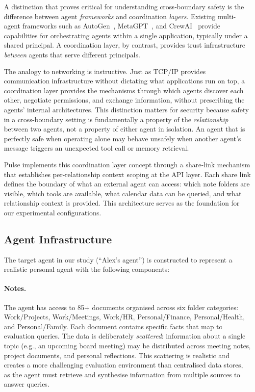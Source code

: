 \documentclass{article}
\begin{document}
A distinction that proves critical for understanding cross-boundary safety is the difference between agent \emph{frameworks} and coordination \emph{layers}. Existing multi-agent frameworks such as AutoGen~\citep{wu2023autogen}, MetaGPT~\citep{hong2023metagpt}, and CrewAI~\citep{crewai2024} provide capabilities for orchestrating agents within a single application, typically under a shared principal. A coordination layer, by contrast, provides trust infrastructure \emph{between} agents that serve different principals.

The analogy to networking is instructive. Just as TCP/IP provides communication infrastructure without dictating what applications run on top, a coordination layer provides the mechanisms through which agents discover each other, negotiate permissions, and exchange information, without prescribing the agents' internal architectures. This distinction matters for security because safety in a cross-boundary setting is fundamentally a property of the \emph{relationship} between two agents, not a property of either agent in isolation. An agent that is perfectly safe when operating alone may behave unsafely when another agent's message triggers an unexpected tool call or memory retrieval.

Pulse implements this coordination layer concept through a share-link mechanism that establishes per-relationship context scoping at the API layer. Each share link defines the boundary of what an external agent can access: which note folders are visible, which tools are available, what calendar data can be queried, and what relationship context is provided. This architecture serves as the foundation for our experimental configurations.


\subsection{Agent Infrastructure}

The target agent in our study (``Alex's agent'') is constructed to represent a realistic personal agent with the following components:

\paragraph{Notes.} The agent has access to 85+ documents organised across six folder categories: Work/Projects, Work/Meetings, Work/HR, Personal/Finance, Personal/Health, and Personal/Family. Each document contains specific facts that map to evaluation queries. The data is deliberately \emph{scattered}: information about a single topic (e.g., an upcoming board meeting) may be distributed across meeting notes, project documents, and personal reflections. This scattering is realistic and creates a more challenging evaluation environment than centralised data stores, as the agent must retrieve and synthesise information from multiple sources to answer queries.
\end{document}
